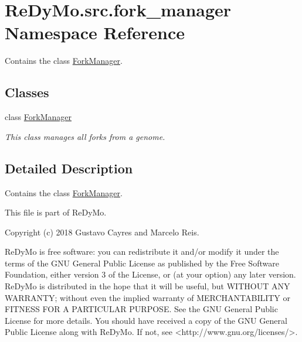 \hypertarget{namespaceReDyMo_1_1src_1_1fork__manager}{}\section{Re\+Dy\+Mo.\+src.\+fork\+\_\+manager Namespace Reference}
\label{namespaceReDyMo_1_1src_1_1fork__manager}


Contains the class \mbox{\hyperlink{classReDyMo_1_1src_1_1fork__manager_1_1ForkManager}{Fork\+Manager}}.  


\subsection*{Classes}
\begin{DoxyCompactItemize}
\item 
class \mbox{\hyperlink{classReDyMo_1_1src_1_1fork__manager_1_1ForkManager}{Fork\+Manager}}
\begin{DoxyCompactList}\small\item\em This class manages all forks from a genome. \end{DoxyCompactList}\end{DoxyCompactItemize}


\subsection{Detailed Description}
Contains the class \mbox{\hyperlink{classReDyMo_1_1src_1_1fork__manager_1_1ForkManager}{Fork\+Manager}}. 

\begin{DoxyVerb}This file is part of ReDyMo.

Copyright (c) 2018  Gustavo Cayres and Marcelo Reis.

ReDyMo is free software: you can redistribute it and/or modify it
under the terms of the GNU General Public License as published by the
Free Software Foundation, either version 3 of the License, or (at your
option) any later version.
ReDyMo is distributed in the hope that it will be useful, but WITHOUT
ANY WARRANTY; without even the implied warranty of MERCHANTABILITY or
FITNESS FOR A PARTICULAR PURPOSE. See the GNU General Public License
for more details.
You should have received a copy of the GNU General Public License along
with ReDyMo. If not, see <http://www.gnu.org/licenses/>.\end{DoxyVerb}
